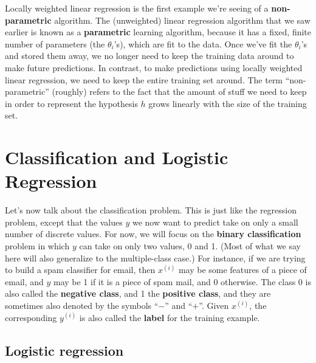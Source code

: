 Locally weighted linear regression is the first example we're seeing of a
\textbf{non-parametric} algorithm. The (unweighted) linear regression algorithm
that we saw earlier is known as a \textbf{parametric} learning algorithm, because
it has a fixed, finite number of parameters (the $\theta_i$'s), which are fit to the
data. Once we've fit the $\theta_i$'s and stored them away, we no longer need to
keep the training data around to make future predictions. In contrast, to
make predictions using locally weighted linear regression, we need to keep
the entire training set around. The term ``non-parametric'' (roughly) refers
to the fact that the amount of stuff we need to keep in order to represent the
hypothesis $h$ grows linearly with the size of the training set.



\chapter{Classification and Logistic Regression}
\label{cha:classification_logistic_regression}

Let's now talk about the classification problem. This is just like the regression
problem, except that the values $y$ we now want to predict take on only
a small number of discrete values. For now, we will focus on the \textbf{binary
classification} problem in which $y$ can take on only two values, 0 and 1.
(Most of what we say here will also generalize to the multiple-class case.)
For instance, if we are trying to build a spam classifier for email, then $x^{(i)}$
may be some features of a piece of email, and $y$ may be 1 if it is a piece
of spam mail, and 0 otherwise. The class 0 is also called the \textbf{negative class}, and 1 %
the \textbf{positive class}, and they are sometimes also denoted by the symbols ``$-$''
and ``$+$''. Given $x^{(i)}$, the corresponding $y^{(i)}$ is also called the \textbf{label} for the
training example.

\section{Logistic regression} %

\titlespacing*{\part}{0pt}{50pt}{40pt} %
\titlespacing*{\chapter}{0pt}{50pt}{40pt} %
